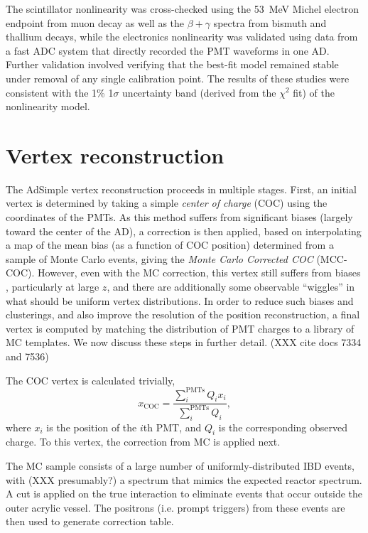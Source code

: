\documentclass[../thesis.tex]{subfiles}
\begin{document}
The scintillator nonlinearity was cross-checked using the 53~MeV Michel electron endpoint from muon decay as well as the $\beta+\gamma$ spectra from bismuth and thallium decays, while the electronics nonlinearity was validated using data from a fast ADC system that directly recorded the PMT waveforms in one AD. Further validation involved verifying that the best-fit model remained stable under removal of any single calibration point. The results of these studies were consistent with the 1\% 1$\sigma$ uncertainty band (derived from the $\chi^2$ fit) of the nonlinearity model.

\section{Vertex reconstruction}
\label{sec:reconVertex}

The AdSimple vertex reconstruction proceeds in multiple stages. First, an initial vertex is determined by taking a simple \emph{center of charge} (COC) using the coordinates of the PMTs. As this method suffers from significant biases (largely toward the center of the AD), a correction is then applied, based on interpolating a map of the mean bias (as a function of COC position) determined from a sample of Monte Carlo events, giving the \emph{Monte Carlo Corrected COC} (MCC-COC). However, even with the MC correction, this vertex still suffers from biases , particularly at large $z$, and there are additionally some observable ``wiggles'' in what should be uniform vertex distributions. In order to reduce such biases and clusterings, and also improve the resolution of the position reconstruction, a final vertex is computed by matching the distribution of PMT charges to a library of MC templates. We now discuss these steps in further detail. (XXX cite docs 7334 and 7536)


The COC vertex is calculated trivially,
\begin{equation*}
  x_{\mathrm{COC}} = \frac{\sum_{i}^{\mathrm{PMTs}} Q_i x_i}{\sum_i^{\mathrm{PMTs}} Q_i},
\end{equation*}
where $x_i$ is the position of the $i$th PMT, and $Q_i$ is the corresponding observed charge. To this vertex, the correction from MC is applied next.

The MC sample consists of a large number of uniformly-distributed IBD events, with (XXX presumably?) a spectrum that mimics the expected reactor spectrum. A cut is applied on the true interaction to eliminate events that occur outside the outer acrylic vessel. The positrons (i.e. prompt triggers) from these events are then used to generate correction table.
\end{document}
